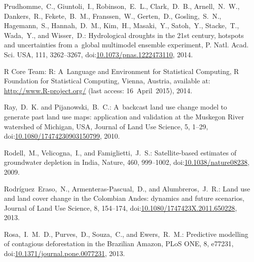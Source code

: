 \documentclass[gmdd, online, hvmath]{copernicus}
\begin{document}
\begin{thebibliography}{97}
   Prudhomme,~C., Giuntoli,~I.,
    Robinson,~E.~L., Clark,~D.~B., Arnell,~N.~W., Dankers,~R.,
    Fekete,~B.~M., Franssen,~W., Gerten,~D., Gosling,~S.~N.,
    Hagemann,~S., Hannah,~D.~M., Kim,~H., Masaki,~Y., Satoh,~Y.,
    Stacke,~T., Wada,~Y., and Wisser,~D.: Hydrological droughts in the
    21st century, hotspots and uncertainties from a~global multimodel
    ensemble experiment, P. Natl. Acad. Sci. USA, 111, 3262--3267,
    doi:\href{http://dx.doi.org/10.1073/pnas.1222473110}{10.1073/pnas.1222473110}, 2014.


   {R Core Team}: R: A~Language
    and Environment for Statistical Computing, R Foundation for
    Statistical Computing, Vienna, Austria, available at:
    \url{http://www.R-project.org/} (last access: 16~April~2015), 2014.


   Ray,~D.~K. and
    Pijanowski,~B.~C.: A~backcast land use change model to generate
    past land use maps: application and validation at the Muskegon
    River watershed of Michigan, {USA}, Journal of Land Use
    Science, 5, 1--29,
    doi:\href{http://dx.doi.org/10.1080/17474230903150799}{10.1080/17474230903150799}, 2010.


   Rodell,~M., Velicogna,~I., and
    Famiglietti,~J.~S.: Satellite-based estimates of groundwater
    depletion in India, Nature, 460, 999--1002,
    doi:\href{http://dx.doi.org/10.1038/nature08238}{10.1038/nature08238}, 2009.


    Rodr\'{i}guez~Eraso,~N., {Armenteras-Pascual},~D., and
    Alumbreros,~J.~R.: Land use and land cover change in the Colombian
    Andes: dynamics and future scenarios, Journal of Land Use
    Science, 8,
    154--174,
doi:\href{http://dx.doi.org/10.1080/1747423X.2011.650228}{10.1080/1747423X.2011.650228}, 2013.


   Rosa,~I.~M.~D., Purves,~D., Souza,~C., and
    Ewers,~R.~M.: Predictive modelling of contagious deforestation in
    the Brazilian Amazon, {PLoS} {ONE}, 8, e77231,
    doi:\href{http://dx.doi.org/10.1371/journal.pone.0077231}{10.1371/journal.pone.0077231}, 2013.



\end{thebibliography}
\end{document}
